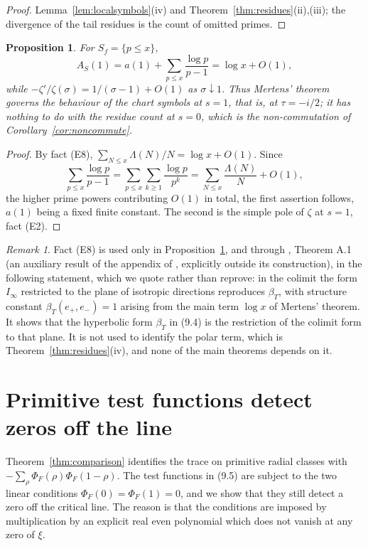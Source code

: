 \documentclass[11pt]{amsart}
\newtheorem{proposition}[theorem]{Proposition}
\theoremstyle{definition}
\theoremstyle{remark}
\newtheorem{remark}[theorem]{Remark}
\begin{document}
\begin{proof}
Lemma~\ref{lem:localsymbols}(iv) and
Theorem~\ref{thm:residues}(ii),(iii); the divergence of the tail residues is
the count of omitted primes.
\end{proof}

\begin{proposition}
\label{prop:mertens}
For $S_f=\{p\le x\}$,
\[
  A_S(1)=a(1)+\sum_{p\le x}\frac{\log p}{p-1}=\log x+O(1),
\]
while $-\zeta'/\zeta(\sigma)=1/(\sigma-1)+O(1)$ as $\sigma\downarrow1$.  Thus
Mertens' theorem governs the behaviour of the chart symbols at $s=1$, that is,
at $\tau=-i/2$; it has nothing to do with the residue count at $s=0$, which is
the non-commutation of Corollary~\emph{\ref{cor:noncommute}}.
\end{proposition}

\begin{proof}
By fact (E8), $\sum_{N\le x}\Lambda(N)/N=\log x+O(1)$.  Since
\[
  \sum_{p\le x}\frac{\log p}{p-1}=\sum_{p\le x}\sum_{k\ge1}\frac{\log p}{p^k}
  =\sum_{N\le x}\frac{\Lambda(N)}N+O(1),
\]
the higher prime powers contributing $O(1)$ in total, the first assertion
follows, $a(1)$ being a fixed finite constant.  The second is the simple pole
of $\zeta$ at $s=1$, fact (E2).
\end{proof}

\begin{remark}
\label{rem:mertens-scope}
Fact (E8) is used only in Proposition~\ref{prop:mertens}, and through
\cite{P43}, Theorem A.1 (an auxiliary result of the appendix of
\cite{P43}, explicitly outside its construction), in the following statement,
which we quote rather than reprove: in the colimit the form $I_\infty$ restricted to the plane of
isotropic directions reproduces $\beta_T$, with structure constant
$\beta_T(e_+,e_-)=1$ arising from the main term $\log x$ of Mertens' theorem.
It shows that the hyperbolic form $\beta_T$ in (9.4) is the restriction of the
colimit form to that plane.  It is not used to identify the polar term, which
is Theorem~\ref{thm:residues}(iv), and none of the main theorems depends on
it.
\end{remark}

\section{Primitive test functions detect zeros off the line}
\label{sec:sufficiency}

Theorem~\ref{thm:comparison} identifies the trace on primitive radial classes
with $-\sum_\rho\Phi_F(\rho)\Phi_F(1-\rho)$.  The test functions in (9.5) are
subject to the two linear conditions $\Phi_F(0)=\Phi_F(1)=0$, and we show that
they still detect a zero off the critical line.  The reason is that the
conditions are imposed by multiplication by an explicit real even polynomial
which does not vanish at any zero of $\xi$.
\end{document}
